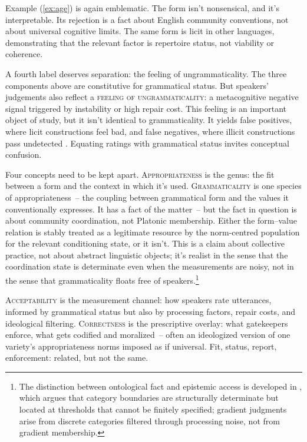 \documentclass[12pt,letterpaper]{article}
\newcommand{\term}[1]{\textsc{#1}}
\begin{document}
Example (\ref{ex:age}) is again emblematic. The form isn't nonsensical, and it's interpretable. Its rejection is a fact about English community conventions, not about universal cognitive limits. The same form is licit in other languages, demonstrating that the relevant factor is repertoire status, not viability or coherence.

A fourth label deserves separation: the feeling of ungrammaticality. The three components above are constitutive for grammatical status. But speakers' judgements also reflect a \term{feeling of ungrammaticality}: a metacognitive negative signal triggered by instability or high repair cost. This feeling is an important object of study, but it isn't identical to grammaticality. It yields false positives, where licit constructions feel bad, and false negatives, where illicit constructions pass undetected \autocite{Fanselow2021}. Equating ratings with grammatical status invites conceptual confusion.

Four concepts need to be kept apart. \term{Appropriateness} is the genus: the fit between a form and the context in which it's used. \term{Grammaticality} is one species of appropriateness~-- the coupling between grammatical form and the values it conventionally expresses. It has a fact of the matter~-- but the fact in question is about community coordination, not Platonic membership. Either the form--value relation is stably treated as a legitimate resource by the norm-centred population for the relevant conditioning state, or it isn't. This is a claim about collective practice, not about abstract linguistic objects; it's realist in the sense that the coordination state is determinate even when the measurements are noisy, not in the sense that grammaticality floats free of speakers.\footnote{The distinction between ontological fact and epistemic access is developed in \textcite[ch.~5]{reynolds2025hpcbook}, which argues that category boundaries are structurally determinate but located at thresholds that cannot be finitely specified; gradient judgments arise from discrete categories filtered through processing noise, not from gradient membership.}

\term{Acceptability} is the measurement channel: how speakers rate utterances, informed by grammatical status but also by processing factors, repair costs, and ideological filtering. \term{Correctness} is the prescriptive overlay: what gatekeepers enforce, what gets codified and moralized~-- often an ideologized version of one variety's appropriateness norms imposed as if universal. Fit, status, report, enforcement: related, but not the same.
\end{document}
